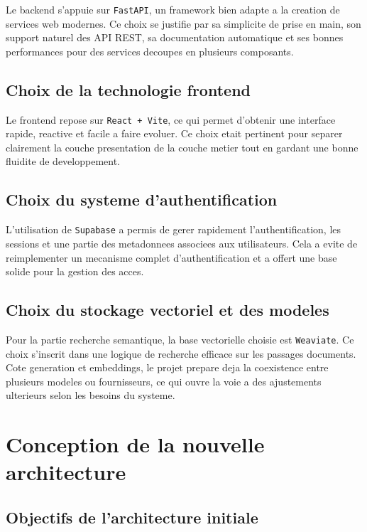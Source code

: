 Le backend s'appuie sur \texttt{FastAPI}, un framework bien adapte a la creation de services web modernes. Ce choix se justifie par sa simplicite de prise en main, son support naturel des API REST, sa documentation automatique et ses bonnes performances pour des services decoupes en plusieurs composants.

\subsection{Choix de la technologie frontend}

Le frontend repose sur \texttt{React + Vite}, ce qui permet d'obtenir une interface rapide, reactive et facile a faire evoluer. Ce choix etait pertinent pour separer clairement la couche presentation de la couche metier tout en gardant une bonne fluidite de developpement.

\subsection{Choix du systeme d'authentification}

L'utilisation de \texttt{Supabase} a permis de gerer rapidement l'authentification, les sessions et une partie des metadonnees associees aux utilisateurs. Cela a evite de reimplementer un mecanisme complet d'authentification et a offert une base solide pour la gestion des acces.

\subsection{Choix du stockage vectoriel et des modeles}

Pour la partie recherche semantique, la base vectorielle choisie est \texttt{Weaviate}. Ce choix s'inscrit dans une logique de recherche efficace sur les passages documents. Cote generation et embeddings, le projet prepare deja la coexistence entre plusieurs modeles ou fournisseurs, ce qui ouvre la voie a des ajustements ulterieurs selon les besoins du systeme.

\section{Conception de la nouvelle architecture}

\subsection{Objectifs de l'architecture initiale}

